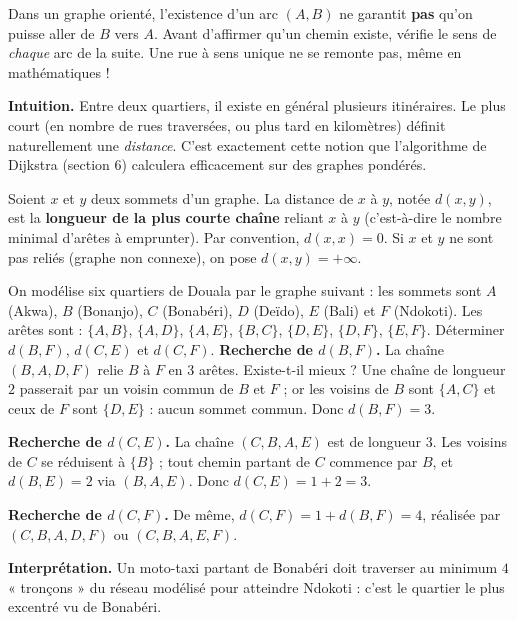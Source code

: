 \documentclass[11pt]{article}
\newcommand{\cle}[1]{{\popxbold\color{popdark}#1}}
\newcounter{popsec}
\newcounter{popsub}
\newcommand{\courssub}[1]{%
  \stepcounter{popsub}%
  \par\vspace{9pt}\noindent{\popxbold\fontsize{11.5}{13}\selectfont\color{popink}{\color{poporange}\thepopsec.\thepopsub}\hspace{6pt}#1}\par\nopagebreak\vspace{4pt}
}
\begin{document}
\begin{attention}
Dans un graphe orienté, l'existence d'un arc $(A, B)$ ne garantit \textbf{pas} qu'on puisse aller de $B$ vers $A$. Avant d'affirmer qu'un chemin existe, vérifie le sens de \emph{chaque} arc de la suite. Une rue à sens unique ne se remonte pas, même en mathématiques !
\end{attention}

\courssub{Distance entre deux sommets}

\textbf{Intuition.} Entre deux quartiers, il existe en général plusieurs itinéraires. Le plus court (en nombre de rues traversées, ou plus tard en kilomètres) définit naturellement une \emph{distance}. C'est exactement cette notion que l'algorithme de Dijkstra (section 6) calculera efficacement sur des graphes pondérés.

\begin{definition}
Soient $x$ et $y$ deux sommets d'un graphe. La \cle{distance} de $x$ à $y$, notée $d(x, y)$, est la \textbf{longueur de la plus courte chaîne} reliant $x$ à $y$ (c'est-à-dire le nombre minimal d'arêtes à emprunter). Par convention, $d(x, x) = 0$. Si $x$ et $y$ ne sont pas reliés (graphe non connexe), on pose $d(x, y) = +\infty$.
\end{definition}

\begin{exoresolu}
On modélise six quartiers de Douala par le graphe suivant : les sommets sont $A$ (Akwa), $B$ (Bonanjo), $C$ (Bonabéri), $D$ (Deïdo), $E$ (Bali) et $F$ (Ndokoti). Les arêtes sont :
$\{A,B\}$, $\{A,D\}$, $\{A,E\}$, $\{B,C\}$, $\{D,E\}$, $\{D,F\}$, $\{E,F\}$.
Déterminer $d(B, F)$, $d(C, E)$ et $d(C, F)$.
\tcblower
\textbf{Recherche de $d(B,F)$.} La chaîne $(B, A, D, F)$ relie $B$ à $F$ en $3$ arêtes. Existe-t-il mieux ? Une chaîne de longueur $2$ passerait par un voisin commun de $B$ et $F$ ; or les voisins de $B$ sont $\{A, C\}$ et ceux de $F$ sont $\{D, E\}$ : aucun sommet commun. Donc $d(B, F) = 3$.

\textbf{Recherche de $d(C,E)$.} La chaîne $(C, B, A, E)$ est de longueur $3$. Les voisins de $C$ se réduisent à $\{B\}$ ; tout chemin partant de $C$ commence par $B$, et $d(B, E) = 2$ via $(B, A, E)$. Donc $d(C, E) = 1 + 2 = 3$.

\textbf{Recherche de $d(C,F)$.} De même, $d(C, F) = 1 + d(B, F) = 4$, réalisée par $(C, B, A, D, F)$ ou $(C, B, A, E, F)$.

\textbf{Interprétation.} Un moto-taxi partant de Bonabéri doit traverser au minimum $4$ « tronçons » du réseau modélisé pour atteindre Ndokoti : c'est le quartier le plus excentré vu de Bonabéri.
\end{exoresolu}
\end{document}
